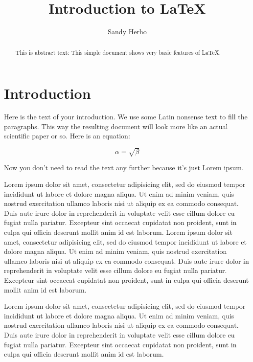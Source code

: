 \documentclass{article}
\begin{document}
\title{Introduction to \LaTeX{}}
\author{Sandy Herho}

\maketitle

\begin{abstract}
This is abstract text: This simple document shows very basic features of
\LaTeX{}.
\end{abstract}


\section{Introduction}

Here is the text of your introduction. We use some Latin nonsense text to fill
the paragraphs. This way the resulting document will look more like an actual
scientific paper or so. Here is an equation:

\begin{equation}
    \label{simple_equation}
    \alpha = \sqrt{ \beta }
\end{equation}

Now you don't need to read the text any further because it's just Lorem ipsum.

Lorem ipsum dolor sit amet, consectetur adipisicing elit, sed do eiusmod tempor
incididunt ut labore et dolore magna aliqua. Ut enim ad minim veniam, quis
nostrud exercitation ullamco laboris nisi ut aliquip ex ea commodo consequat.
Duis aute irure dolor in reprehenderit in voluptate velit esse cillum dolore eu
fugiat nulla pariatur. Excepteur sint occaecat cupidatat non proident, sunt in
culpa qui officia deserunt mollit anim id est laborum. Lorem ipsum dolor sit
amet, consectetur adipisicing elit, sed do eiusmod tempor incididunt ut labore
et dolore magna aliqua. Ut enim ad minim veniam, quis nostrud exercitation
ullamco laboris nisi ut aliquip ex ea commodo consequat. Duis aute irure dolor
in reprehenderit in voluptate velit esse cillum dolore eu fugiat nulla
pariatur. Excepteur sint occaecat cupidatat non proident, sunt in culpa qui
officia deserunt mollit anim id est laborum.

Lorem ipsum dolor sit amet, consectetur adipisicing elit, sed do eiusmod tempor
incididunt ut labore et dolore magna aliqua. Ut enim ad minim veniam, quis
nostrud exercitation ullamco laboris nisi ut aliquip ex ea commodo consequat.
Duis aute irure dolor in reprehenderit in voluptate velit esse cillum dolore eu
fugiat nulla pariatur. Excepteur sint occaecat cupidatat non proident, sunt in
culpa qui officia deserunt mollit anim id est laborum.
\end{document}
